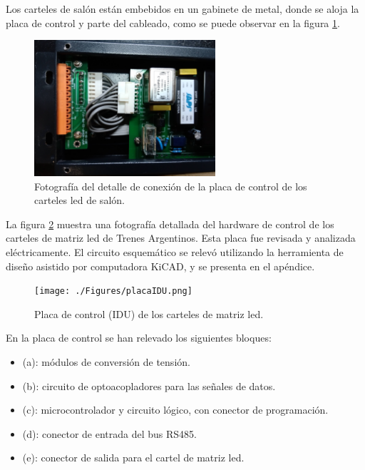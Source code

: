 Los carteles de salón están embebidos en un gabinete de metal, donde se aloja la placa de control y parte del cableado, como se puede observar en la figura \ref{fig:displayController}.

\begin{figure}[H]
	\centering
	\includegraphics[width=0.6\textwidth]{./Figures/displayController.jpg}
	\caption{Fotografía del detalle de conexión de la placa de control de los carteles led de salón.}
	\label{fig:displayController}
\end{figure}

La figura \ref{fig:placa} muestra una fotografía detallada del hardware de control de los carteles de matriz led de Trenes Argentinos. Esta placa fue revisada y analizada eléctricamente. El circuito esquemático se relevó utilizando la herramienta de diseño asistido por computadora KiCAD, y se presenta en el apéndice.\\

\begin{figure}[H]
	\centering
	\texttt{[image: ./Figures/placaIDU.png]}
	\caption{Placa de control (IDU) de los carteles de matriz led.}
	\label{fig:placa}
\end{figure}

En la placa de control se han relevado los siguientes bloques:

\begin{itemize}
\item (a): módulos de conversión de tensión.
\item (b): circuito de optoacopladores para las señales de datos.
\item (c): microcontrolador y circuito lógico, con conector de programación.
\item (d): conector de entrada del bus RS485.
\item (e): conector de salida para el cartel de matriz led.
\end{itemize}

